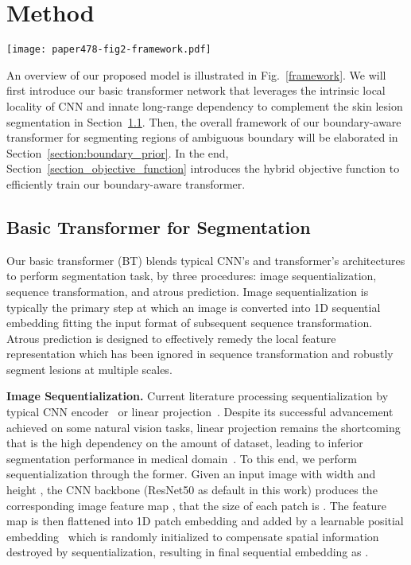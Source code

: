 \documentclass[runningheads]{paper478-llncs}
\begin{document}
\section{Method}

\begin{figure*}[t]
    \texttt{[image: paper478-fig2-framework.pdf]}
    \caption{An overview of the proposed Boundary-Aware Transformer framework.}
    \label{framework}
\end{figure*}

An overview of our proposed model is illustrated in Fig.~\ref{framework}.
We will first introduce our basic transformer network that leverages the intrinsic local locality of CNN and innate long-range dependency to complement the skin lesion segmentation in Section~\ref{section:trans_for_seg}.
Then, the overall framework of our boundary-aware transformer for segmenting regions of ambiguous boundary will be elaborated in Section~\ref{section:boundary_prior}. 
In the end, Section~\ref{section_objective_function} introduces the hybrid objective function to efficiently train our boundary-aware transformer.

\subsection{Basic Transformer for Segmentation}
\label{section:trans_for_seg}
Our basic transformer (BT) blends typical CNN's and transformer's architectures to perform segmentation task, by  three procedures: image sequentialization, sequence transformation, and atrous prediction. Image sequentialization is typically the primary step at which an image is converted into 1D sequential embedding fitting the input format of subsequent sequence transformation. 
Atrous prediction is designed to effectively remedy the local feature representation which has been ignored in sequence transformation and robustly segment lesions at multiple scales.

\textbf{Image Sequentialization.}
Current literature processing sequentialization by typical CNN encoder~\cite{carion2020detr,li2020sttr} or linear projection~\cite{dosovitskiy2020vit,zheng2020rethinking}.
Despite its successful advancement achieved on some natural vision tasks, linear projection remains the shortcoming that is the high dependency on the amount of dataset, leading to inferior segmentation performance in medical domain~\cite{chen2021transunet}. 
To this end, we perform sequentialization through the former.
Given an input image  with width  and height , the CNN backbone (ResNet50 as default in this work) produces the corresponding image feature map , that the size of each patch is . 
The feature map is then flattened into 1D patch embedding and added by a learnable positial embedding~\cite{gehring2017convolutional} which is randomly initialized to compensate spatial information destroyed by sequentialization, resulting in final sequential embedding as .
\end{document}
